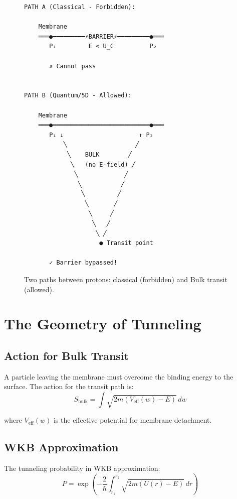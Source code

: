 \documentclass[12pt,a4paper]{article}
\begin{document}
\begin{figure}[H]
\centering
\begin{verbatim}
PATH A (Classical - Forbidden):

    Membrane
    ═══●━━━━━━━━━⚡BARRIER⚡━━━━━━━━━●═══
       P₁         E < U_C          P₂
       
       ✗ Cannot pass


PATH B (Quantum/5D - Allowed):

    Membrane
    ═══●═══════════════════════════●═══
       P₁ ↓                     ↑ P₂
           ╲                   ╱
            ╲    BULK        ╱
             ╲   (no E-field) ╱
              ╲             ╱
               ╲           ╱
                ╲         ╱
                 ╲       ╱
                  ╲     ╱
                   ╲   ╱
                    ╲ ╱
                     ● Transit point
                     
       ✓ Barrier bypassed!
\end{verbatim}
\caption{Two paths between protons: classical (forbidden) and Bulk transit (allowed).}
\end{figure}

\section{The Geometry of Tunneling}

\subsection{Action for Bulk Transit}

A particle leaving the membrane must overcome the binding energy to the surface. The action for the transit path is:
\begin{equation}
S_{\text{bulk}} = \int \sqrt{2m(V_{\text{eff}}(w) - E)} \, dw
\end{equation}

where $V_{\text{eff}}(w)$ is the effective potential for membrane detachment.

\subsection{WKB Approximation}

The tunneling probability in WKB approximation:
\begin{equation}
P = \exp\left(-\frac{2}{\hbar}\int_{r_1}^{r_2} \sqrt{2m(U(r) - E)} \, dr\right)
\end{equation}
\end{document}
